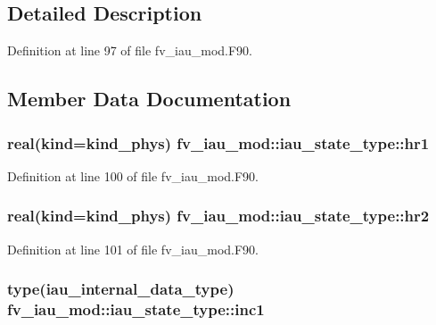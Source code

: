 \subsection{Detailed Description}


Definition at line 97 of file fv\-\_\-iau\-\_\-mod.\-F90.



\subsection{Member Data Documentation}
\subsubsection[{hr1}]{\setlength{\rightskip}{0pt plus 5cm}real(kind=kind\-\_\-phys) fv\-\_\-iau\-\_\-mod\-::iau\-\_\-state\-\_\-type\-::hr1\hspace{0.3cm}{\ttfamily [private]}}\label{structfv__iau__mod_1_1iau__state__type_a38fd8515897c8144e55a7e1298fba14e}


Definition at line 100 of file fv\-\_\-iau\-\_\-mod.\-F90.

\subsubsection[{hr2}]{\setlength{\rightskip}{0pt plus 5cm}real(kind=kind\-\_\-phys) fv\-\_\-iau\-\_\-mod\-::iau\-\_\-state\-\_\-type\-::hr2\hspace{0.3cm}{\ttfamily [private]}}\label{structfv__iau__mod_1_1iau__state__type_a2d22a0517262e33fe37c31d99638e512}


Definition at line 101 of file fv\-\_\-iau\-\_\-mod.\-F90.

\subsubsection[{inc1}]{\setlength{\rightskip}{0pt plus 5cm}type({\bf iau\-\_\-internal\-\_\-data\-\_\-type}) fv\-\_\-iau\-\_\-mod\-::iau\-\_\-state\-\_\-type\-::inc1\hspace{0.3cm}{\ttfamily [private]}}\label{structfv__iau__mod_1_1iau__state__type_a0af7b395dcb45a752acdf6f3ebad71fa}


